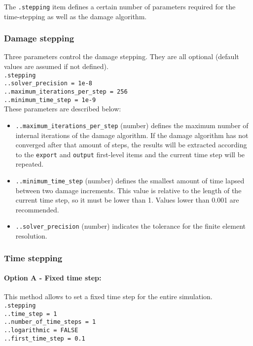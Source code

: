 \documentclass[10pt]{article}
\begin{document}
The \verb+.stepping+ item defines a certain number of parameters required for the time-stepping as well as the damage algorithm.

\subsubsection*{Damage stepping}

Three parameters control the damage stepping.
They are all optional (default values are assumed if not defined).\\

\noindent \verb+.stepping+\\
\verb+..solver_precision = 1e-8+\\
\verb+..maximum_iterations_per_step = 256+\\
\verb+..minimum_time_step = 1e-9+\\

These parameters are described below:

\begin{itemize}[label=]
	\item \verb+..maximum_iterations_per_step+ (number) defines the maximum number of internal iterations of the damage algorithm.
If the damage algorithm has not converged after that amount of steps, the results will be extracted according to the \verb+export+ and \verb+output+ first-level items and the current time step will be repeated.
	\item \verb+..minimum_time_step+ (number) defines the smallest amount of time lapsed between two damage increments.
This value is relative to the length of the current time step, so it must be lower than 1.
Values lower than 0.001 are recommended.
	\item \verb+..solver_precision+ (number) indicates the tolerance for the finite element resolution.
\end{itemize}

\subsubsection*{Time stepping}

\paragraph{Option A - Fixed time step:} This method allows to set a fixed time step for the entire simulation.\\

\noindent \verb+.stepping+\\
\verb+..time_step = 1+\\
\verb+..number_of_time_steps = 1+\\
\verb+..logarithmic = FALSE+\\
\verb+..first_time_step = 0.1+\\
\end{document}
